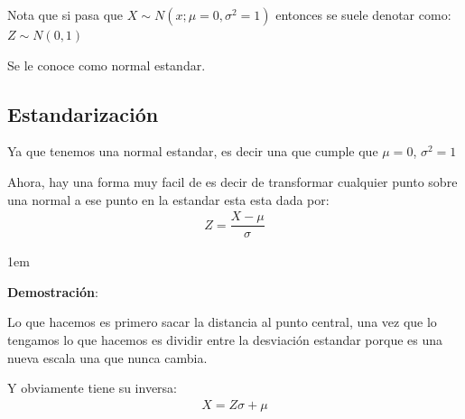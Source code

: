 \documentclass[12pt, fleqn]{report}                             %
\newenvironment{SmallIndentation}[1][0.75em]                    %
        {\begin{adjustwidth}{#1}{}\begin{footnotesize}}             %
        {\end{footnotesize}\end{adjustwidth}}                       %
\newcommand \Quote              {\qq}                           %
\theoremstyle{break}                                            %
\begin{document}
                    Nota que si pasa que $X \sim N(x; \mu = 0, \sigma^2 = 1)$
                    entonces se suele denotar como:
                    \\$Z \sim N(0, 1)$ 

                    Se le conoce como normal estandar.

            \subsection{Estandarización}  

                Ya que tenemos una normal estandar, es decir una que cumple que $\mu = 0$,
                $\sigma^2 = 1$

                Ahora, hay una forma muy facil de \Quote{estandarizar} es decir
                de transformar cualquier punto sobre una normal a ese punto en la estandar
                esta esta dada por:
                \begin{align*}
                    Z = \dfrac{X - \mu}{\sigma}
                \end{align*}

                \begin{SmallIndentation}[1em]
                    \textbf{Demostración}:
                    
                    Lo que hacemos es primero sacar la distancia al punto central, una vez que lo tengamos
                    lo que hacemos es dividir entre la desviación estandar porque es una nueva escala
                    una que nunca cambia.
                
                \end{SmallIndentation}
                    

                Y obviamente tiene su inversa:
                \begin{align*}
                    X = Z\sigma  + \mu
                \end{align*}


            \clearpage
\end{document}
